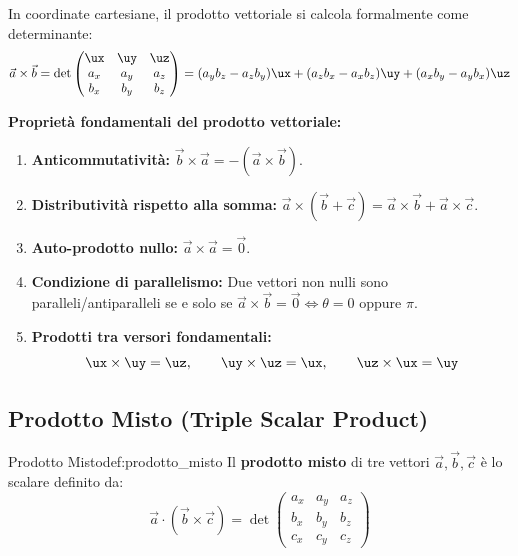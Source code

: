 In coordinate cartesiane, il prodotto vettoriale si calcola formalmente come determinante:
\begin{equation}
    \vec{a}\times\vec{b} = \det \begin{pmatrix} \ux & \uy & \uz \\ a_x & a_y & a_z \\ b_x & b_y & b_z \end{pmatrix} = (a_y b_z - a_z b_y)\ux + (a_z b_x - a_x b_z)\uy + (a_x b_y - a_y b_x)\uz
\end{equation}

\textbf{Proprietà fondamentali del prodotto vettoriale:}
\begin{enumerate}
    \item \textbf{Anticommutatività:} $\vec{b}\times\vec{a} = -(\vec{a}\times\vec{b})$.
    \item \textbf{Distributività rispetto alla somma:} $\vec{a}\times(\vec{b} + \vec{c}) = \vec{a}\times\vec{b} + \vec{a}\times\vec{c}$.
    \item \textbf{Auto-prodotto nullo:} $\vec{a}\times\vec{a} = \vec{0}$.
    \item \textbf{Condizione di parallelismo:} Due vettori non nulli sono paralleli/antiparalleli se e solo se $\vec{a}\times\vec{b} = \vec{0} \iff \theta = 0 \text{ oppure } \pi$.
    \item \textbf{Prodotti tra versori fondamentali:}
    \begin{equation}
        \ux\times\uy = \uz, \qquad \uy\times\uz = \ux, \qquad \uz\times\ux = \uy
    \end{equation}
\end{enumerate}

\subsection{Prodotto Misto (Triple Scalar Product)}

\begin{definizione}{Prodotto Misto}{def:prodotto_misto}
Il \textbf{prodotto misto} di tre vettori $\vec{a}, \vec{b}, \vec{c}$ è lo scalare definito da:
\begin{equation}
    \vec{a}\cdot(\vec{b}\times\vec{c}) = \det \begin{pmatrix} a_x & a_y & a_z \\ b_x & b_y & b_z \\ c_x & c_y & c_z \end{pmatrix}
\end{equation}
\end{definizione}

